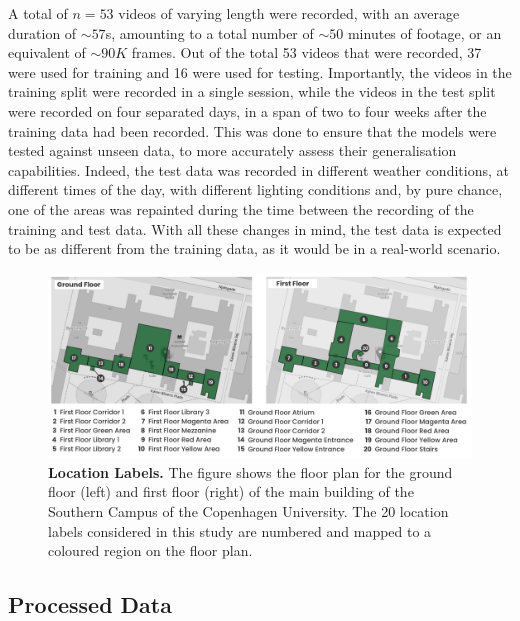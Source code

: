 \documentclass[a4paper]{article}
\begin{document}
A total of $n=53$ videos of varying length were recorded, with an average
duration of $\sim 57$s, amounting to a total number of $\sim 50$ minutes of
footage, or an equivalent of $\sim 90K$ frames. Out of the total 53 videos
that were recorded, 37 were used for training and 16 were used for testing.
Importantly, the videos in the training split were recorded in a single
session, while the videos in the test split were recorded on four separated
days, in a span of two to four weeks after the training data had been
recorded. This was done to ensure that the models were tested against unseen
data, to more accurately assess their generalisation capabilities. Indeed, the 
test data was recorded in different weather conditions, at different times of
the day, with different lighting conditions and, by pure chance, one of the
areas was repainted during the time between the recording of the training and
test data. With all these changes in mind, the test data is expected to be
as different from the training data, as it would be in a real-world scenario.

\begin{figure}
\centering
\includegraphics[width=\textwidth]{figures/location-labels.png}
\caption{
  \textbf{Location Labels.} The figure shows the floor plan for the ground floor
  (left) and first floor (right) of the main building of the Southern Campus of
  the Copenhagen University. The 20 location labels considered in this study are
  numbered and mapped to a coloured region on the floor plan.}

\label{fig:location-labels}
\end{figure}




\subsection{Processed Data} %
\label{sub:processed-data}
\end{document}
